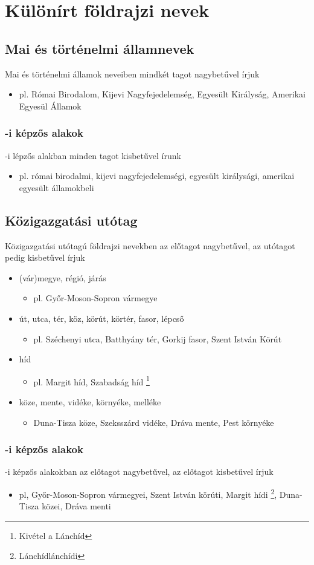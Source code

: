 \documentclass{article}
\begin{document}
\section{Különírt földrajzi nevek}
\subsection{Mai és történelmi államnevek}
Mai és történelmi államok neveiben mindkét tagot nagybetűvel írjuk
\begin{itemize}
    \item pl. Római Birodalom, Kijevi Nagyfejedelemség, Egyesült Királyság, Amerikai Egyesül Államok
\end{itemize}

\subsubsection{-i képzős alakok}
-i lépzős alakban minden tagot kisbetűvel írunk
\begin{itemize}
    \item pl. római birodalmi, kijevi nagyfejedelemségi, egyesült királysági, amerikai egyesült államokbeli
\end{itemize}

\subsection{Közigazgatási utótag}
Közigazgatási utótagú földrajzi nevekben az előtagot nagybetűvel, az utótagot pedig kisbetűvel írjuk

\begin{itemize}
    \item (vár)megye, régió, járás
    \begin{itemize}
        \item   pl. Győr-Moson-Sopron vármegye
    \end{itemize}
    \item út, utca, tér, köz, körút, körtér, fasor, lépcső
    \begin{itemize}
        \item pl. Széchenyi utca, Batthyány tér, Gorkij fasor, Szent István Körút
    \end{itemize}
    \item híd
    \begin{itemize}
        \item pl. Margit híd, Szabadság híd \footnote{Kivétel a Lánchíd}
    \end{itemize}
    \item köze, mente, vidéke, környéke, melléke
    \begin{itemize}
        \item Duna-Tisza köze, Szeksszárd vidéke, Dráva mente, Pest környéke
    \end{itemize}
\end{itemize}

\subsubsection{-i képzős alakok}
-i képzős alakokban az előtagot nagybetűvel, az előtagot kisbetűvel írjuk
\begin{itemize}
    \item pl, Győr-Moson-Sopron vármegyei, Szent István körúti, Margit hídi \footnote{Lánchíd\textrightarrow lánchídi}, Duna-Tisza közei, Dráva menti
\end{itemize}
\end{document}
